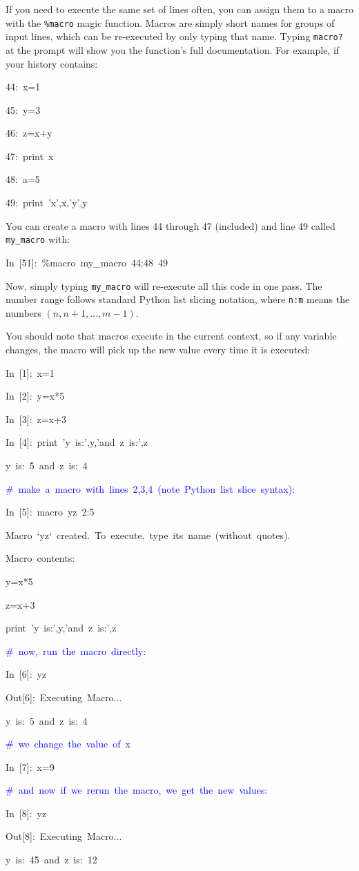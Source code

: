 If you need to execute the same set of lines often, you can assign
them to a macro with the \texttt{\%macro} magic function. Macros are
simply short names for groups of input lines, which can be re-executed
by only typing that name. Typing \texttt{macro?} at the prompt will
show you the function's full documentation. For example, if your history
contains:

\begin{lyxcode}
44:~x=1

45:~y=3

46:~z=x+y

47:~print~x

48:~a=5

49:~print~'x',x,'y',y
\end{lyxcode}
You can create a macro with lines 44 through 47 (included) and line
49 called \texttt{my\_macro} with:

\begin{lyxcode}
In~{[}51]:~\%macro~my\_macro~44:48~49
\end{lyxcode}
Now, simply typing \texttt{my\_macro} will re-execute all this code
in one pass. The number range follows standard Python list slicing
notation, where \texttt{n:m} means the numbers $(n,n+1,\ldots,m-1).$

You should note that macros execute in the current context, so if
any variable changes, the macro will pick up the new value every time
it is executed:

\begin{lyxcode}
In~{[}1]:~x=1

In~{[}2]:~y=x{*}5

In~{[}3]:~z=x+3

In~{[}4]:~print~'y~is:',y,'and~z~is:',z

y~is:~5~and~z~is:~4

\textcolor{blue}{\#~make~a~macro~with~lines~2,3,4~(note~Python~list~slice~syntax):}

In~{[}5]:~macro~yz~2:5

Macro~`yz`~created.~To~execute,~type~its~name~(without~quotes).

Macro~contents:

y=x{*}5

z=x+3

print~'y~is:',y,'and~z~is:',z

\textcolor{blue}{\#~now,~run~the~macro~directly:}

In~{[}6]:~yz

Out{[}6]:~Executing~Macro...

y~is:~5~and~z~is:~4

\textcolor{blue}{\#~we~change~the~value~of~x}

In~{[}7]:~x=9

\textcolor{blue}{\#~and~now~if~we~rerun~the~macro,~we~get~the~new~values:}

In~{[}8]:~yz

Out{[}8]:~Executing~Macro...

y~is:~45~and~z~is:~12
\end{lyxcode}

